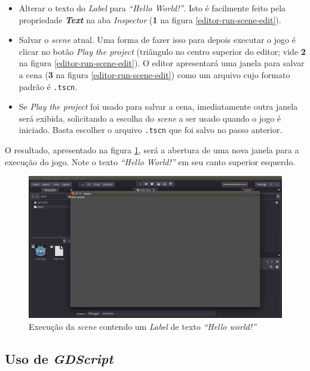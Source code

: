 \begin{itemize}
\item Alterar o texto do \textit{Label} para \textit{``Hello World!''}. Isto é facilmente feito pela propriedade \textbf{\textit{Text}} na aba \textit{Inspector} (\textbf{1} na figura \ref{editor-run-scene-edit}).

\item Salvar o \textit{scene} atual. Uma forma de fazer isso para depois executar o jogo é clicar no botão \textit{Play the project} (triângulo no centro superior do editor; vide \textbf{2} na figura \ref{editor-run-scene-edit}). O editor apresentará uma janela para salvar a cena (\textbf{3} na figura \ref{editor-run-scene-edit}) como um arquivo cujo formato padrão é \texttt{.tscn}.

\item Se \textit{Play the project} foi usado para salvar a cena, imediatamente outra janela será exibida, solicitando a escolha do \textit{scene} a ser usado quando o jogo é iniciado. Basta escolher o arquivo \texttt{.tscn} que foi salvo no passo anterior.
\end{itemize}

O resultado, apresentado na figura \ref{editor-hello-world}, será a abertura de uma nova janela para a execução do jogo. Note o texto \textit{``Hello World!''} em seu canto superior esquerdo.

\begin{figure}[H]
  \centering
  \includegraphics[width=.9\textwidth]{image/editor-hello-world}
  \caption{Execução da \textit{scene} contendo um \textit{Label} de texto \textit{``Hello world!''}}
  \label{editor-hello-world}
\end{figure}


\subsection{Uso de \textit{GDScript}}

